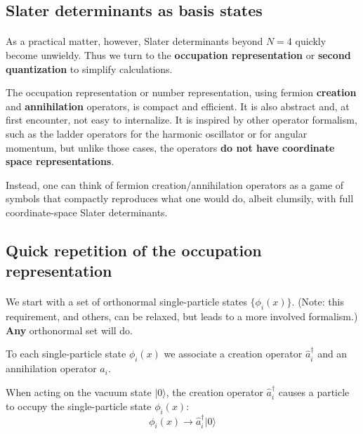 \documentclass[%
oneside,                 %
final,                   %
10pt]{article}
\begin{document}
\noindent



\subsection*{Slater determinants as basis states}

\paragraph{}
As a practical matter, however, Slater determinants beyond $N=4$ quickly become 
unwieldy. Thus we turn to the \textbf{occupation representation} or \textbf{second quantization} to simplify calculations. 

The occupation representation or number representation, using fermion \textbf{creation} and \textbf{annihilation} 
operators, is compact and efficient. It is also abstract and, at first encounter, not easy to 
internalize. It is inspired by other operator formalism, such as the ladder operators for 
the harmonic oscillator or for angular momentum, but unlike those cases, the operators \textbf{do not have coordinate space representations}.

Instead, one can think of fermion creation/annihilation operators as a game of symbols that 
compactly reproduces what one would do, albeit clumsily, with full coordinate-space Slater 
determinants.



\subsection*{Quick repetition of the occupation representation}

\paragraph{}
We start with a set of orthonormal single-particle states $\{ \phi_i(x) \}$. 
(Note: this requirement, and others, can be relaxed, but leads to a 
more involved formalism.) \textbf{Any} orthonormal set will do. 

To each single-particle state $\phi_i(x)$ we associate a creation operator 
$\hat{a}^\dagger_i$ and an annihilation operator $\hat{a}_i$. 

When acting on the vacuum state $| 0 \rangle$, the creation operator $\hat{a}^\dagger_i$ causes 
a particle to occupy the single-particle state $\phi_i(x)$:
\[
\phi_i(x) \rightarrow \hat{a}^\dagger_i |0 \rangle
\]
\end{document}
